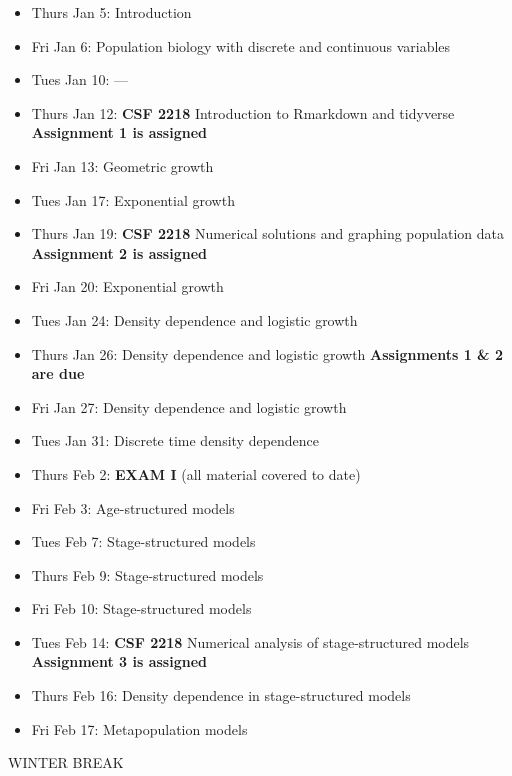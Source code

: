 \documentclass[
]{book}
\providecommand{\tightlist}{%
  \setlength{\itemsep}{0pt}\setlength{\parskip}{0pt}}
\begin{document}
\begin{itemize}
\tightlist
\item
  Thurs Jan 5: Introduction
\item
  Fri Jan 6: Population biology with discrete and continuous variables
\item
  Tues Jan 10: ---
\item
  Thurs Jan 12: \textbf{CSF 2218} Introduction to Rmarkdown and tidyverse \textbf{Assignment 1 is assigned}
\item
  Fri Jan 13: Geometric growth
\item
  Tues Jan 17: Exponential growth
\item
  Thurs Jan 19: \textbf{CSF 2218} Numerical solutions and graphing population data \textbf{Assignment 2 is assigned}
\item
  Fri Jan 20: Exponential growth
\item
  Tues Jan 24: Density dependence and logistic growth
\item
  Thurs Jan 26: Density dependence and logistic growth \textbf{Assignments 1 \& 2 are due}
\item
  Fri Jan 27: Density dependence and logistic growth
\item
  Tues Jan 31: Discrete time density dependence
\item
  Thurs Feb 2: \textbf{EXAM I} (all material covered to date)
\item
  Fri Feb 3: Age-structured models
\item
  Tues Feb 7: Stage-structured models
\item
  Thurs Feb 9: Stage-structured models
\item
  Fri Feb 10: Stage-structured models
\item
  Tues Feb 14: \textbf{CSF 2218} Numerical analysis of stage-structured models \textbf{Assignment 3 is assigned}
\item
  Thurs Feb 16: Density dependence in stage-structured models
\item
  Fri Feb 17: Metapopulation models
\end{itemize}

WINTER BREAK
\end{document}
